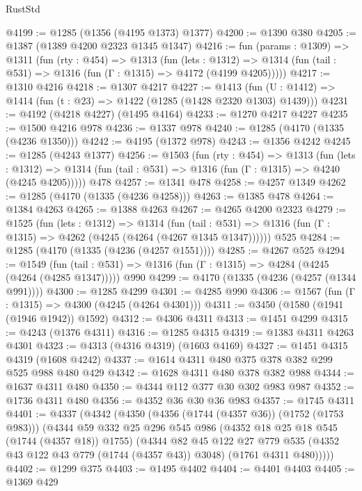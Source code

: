 \begin{lexlean}{RustStd}
\begin{coremodule}
@4199 := @1285 (@1356 (@4195 @1373) @1377)
@4200 := @1390 @380
@4205 := @1387 (@1389 @4200 @2323 @1345 @1347)
@4216 := fun (params : @1309) =>
  @1311
    (fun (rty : @454) =>
    @1313
      (fun (lets : @1312) =>
      @1314 (fun (tail : @531) => @1316 (fun (Γ : @1315) => @4172 (@4199 @4205)))))
@4217 := @1310 @4216
@4218 := @1307 @4217
@4227 := @1413 (fun (U : @1412) => @1414 (fun (t : @23) => @1422 (@1285 (@1428 @2320 @1303) @1439)))
@4231 := @4192 (@4218 @4227) (@1495 @4164)
@4233 := @1270 @4217 @4227
@4235 := @1500 @4216 @978
@4236 := @1337 @978
@4240 := @1285 (@4170 (@1335 (@4236 @1350)))
@4242 := @4195 (@1372 @978)
@4243 := @1356 @4242
@4245 := @1285 (@4243 @1377)
@4256 := @1503
    (fun (rty : @454) =>
    @1313
      (fun (lets : @1312) =>
      @1314 (fun (tail : @531) => @1316 (fun (Γ : @1315) => @4240 (@4245 @4205)))))
    @478
@4257 := @1341 @478
@4258 := @4257 @1349
@4262 := @1285 (@4170 (@1335 (@4236 @4258)))
@4263 := @1385 @478
@4264 := @1384 @4263
@4265 := @1388 @4263
@4267 := @4265 @4200 @2323
@4279 := @1525
    (fun (lets : @1312) =>
    @1314
      (fun (tail : @531) => @1316 (fun (Γ : @1315) => @4262 (@4245 (@4264 (@4267 @1345 @1347))))))
    @525
@4284 := @1285 (@4170 (@1335 (@4236 (@4257 @1551))))
@4285 := @4267 @525
@4294 := @1549
    (fun (tail : @531) => @1316 (fun (Γ : @1315) => @4284 (@4245 (@4264 (@4285 @1347)))))
    @990
@4299 := @4170 (@1335 (@4236 (@4257 (@1344 @991))))
@4300 := @1285 @4299
@4301 := @4285 @990
@4306 := @1567 (fun (Γ : @1315) => @4300 (@4245 (@4264 @4301)))
@4311 := @3450 (@1580 (@1941 (@1946 @1942)) @1592)
@4312 := @4306 @4311
@4313 := @1451 @4299
@4315 := @4243 (@1376 @4311)
@4316 := @1285 @4315
@4319 := @1383 @4311 @4263 @4301
@4323 := @4313 (@4316 @4319) (@1603 @4169)
@4327 := @1451 @4315 @4319 (@1608 @4242)
@4337 := @1614 @4311 @480 @375 @378 @382 @299 @525 @988 @480 @429
@4342 := @1628 @4311 @480 @378 @382 @988
@4344 := @1637 @4311 @480
@4350 := @4344 @112 @377 @30 @302 @983 @987
@4352 := @1736 @4311 @480
@4356 := @4352 @36 @30 @36 @983
@4357 := @1745 @4311
@4401 := @4337
    (@4342
      (@4350
        (@4356 (@1744 (@4357 @36)) (@1752 (@1753 @983)))
        (@4344
          @59
          @332
          @25
          @296
          @545
          @986
          (@4352 @18 @25 @18 @545 (@1744 (@4357 @18)) @1755)
          (@4344
            @82
            @45
            @122
            @27
            @779
            @535
            (@4352 @43 @122 @43 @779 (@1744 (@4357 @43)) @3048)
            (@1761 @4311 @480)))))
@4402 := @1299 @375
@4403 := @1495 @4402
@4404 := @4401 @4403
@4405 := @1369 @429

\end{coremodule}
\end{lexlean}
